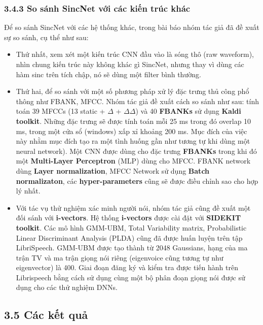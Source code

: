 \documentclass{article}
\begin{document}
	\subsubsection{3.4.3 So sánh SincNet với các kiến trúc khác}
	Để so sánh SincNet với các hệ thống khác, trong bài báo nhóm tác giả đã đề xuất sự so sánh, cụ thể như sau:
	\begin{itemize}
		\item Thứ nhất, xem xét một kiến trúc CNN đầu vào là sóng thô (raw waveform), nhìn chung kiến trúc này không khác gì SincNet, nhưng thay vì dùng các hàm sinc trên tích chập, nó sẽ dùng một filter bình thường.
		\item Thứ hai, để so sánh với một số phương pháp xử lý đặc trưng thủ công phổ thông như FBANK, MFCC. Nhóm tác giả đề xuất cách so sánh như sau: tính toán 39 MFCCs (13 static + $\Delta$ + $\Delta\Delta$) và 40 \textbf{FBANKs} sử dụng \textbf{Kaldi toolkit}. Những đặc trưng sẽ được tính toán mỗi 25 ms trong đó overlap 10 ms, trong một cửa sổ (windows) xấp xỉ khoảng 200 ms. Mục đích của việc này nhằm mục đích tạo ra một tình huống gần như tương tự khi dùng một neural network). Một CNN được dùng cho đặc trưng \textbf{FBANKs} trong khi đó một \textbf{Multi-Layer Perceptron} (MLP) dùng cho MFCC. FBANK network dùng \textbf{Layer normalization}, MFCC Network sử dụng \textbf{Batch normalizaton}, các \textbf{hyper-parameters} cũng sẽ được điều chỉnh sao cho hợp lý nhất.
		\item Với tác vụ thử nghiệm xác minh người nói, nhóm tác giả cũng đề xuất một đối sánh với \textbf{i-vectors}. Hệ thống \textbf{i-vectors} được cài đặt với \textbf{SIDEKIT toolkit}. Các mô hình GMM-UBM, Total Variability matrix, Probabilistic Linear Discriminant Analysis (PLDA) cũng đã được huấn luyện trên tập LibriSpeech. GMM-UBM được tạo thành từ 2048 Gaussians, hạng của ma trận TV và ma trận giọng nói riêng (eigenvoice cũng tương tự như eigenvector) là 400. Giai đoạn đăng ký và kiểm tra được tiến hành trên Librispeech bằng cách sử dụng cùng một bộ phân đoạn giọng nói được sử dụng cho các thử nghiệm DNNs.
	\end{itemize}
	
	\subsection{3.5 Các kết quả}
	
\end{document}
